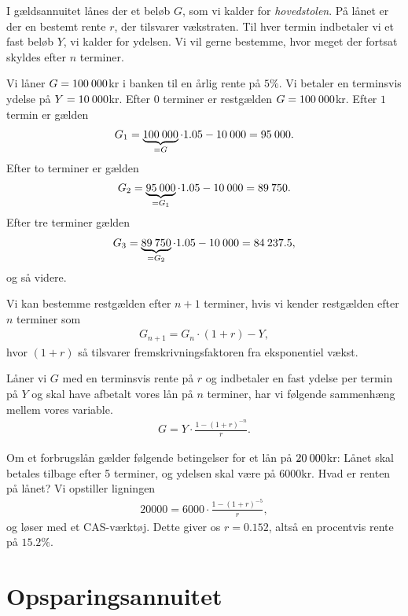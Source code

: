 \documentclass[12pt]{article}
\begin{document}
I gældsannuitet lånes der et beløb $G$, som vi kalder for \textit{hovedstolen}. På lånet er der en bestemt rente $r$, der tilsvarer vækstraten. Til hver termin indbetaler vi et fast beløb $Y$, vi kalder for ydelsen. Vi vil gerne bestemme, hvor meget der fortsat skyldes efter $n$ terminer. 
\begin{exa}
Vi låner $G=100 \hspace{0.8mm} 000$kr i banken til en årlig rente på $5\%$. Vi betaler en terminsvis ydelse på $Y=10 \hspace{0.8mm} 000$kr.
Efter $0$ terminer er restgælden $G=100 \hspace{0.8mm} 000$kr. Efter $1$ termin er gælden
\begin{align*}
G_1 = \underbrace{100 \hspace{0.8mm} 000}_{=G}\cdot 1.05 - 10 \hspace{0.8mm} 000 = 95 \hspace{0.8mm} 000.
\end{align*}   
Efter to terminer er gælden 
\begin{align*}
G_2 = \underbrace{95 \hspace{0.8mm} 000}_{=G_1}\cdot 1.05-10 \hspace{0.8mm} 000 = 89 \hspace{0.8mm} 750.
\end{align*}
Efter tre terminer gælden 
\begin{align*}
G_3 = \underbrace{89 \hspace{0.8mm} 750}_{=G_2} \cdot 1.05 - 10 \hspace{0.8mm} 000 = 84 \hspace{0.8mm} 237.5,
\end{align*}
og så videre. 
\end{exa}
Vi kan bestemme restgælden efter $n+1$ terminer, hvis vi kender restgælden efter $n$ terminer som
\begin{align*}
G_{n+1} = G_{n}\cdot (1+r) - Y, 
\end{align*}
hvor $(1+r)$ så tilsvarer fremskrivningsfaktoren fra eksponentiel vækst. 
\begin{setn}
Låner vi $G$ med en terminsvis rente på $r$ og indbetaler en fast ydelse per termin på $Y$ og skal have afbetalt vores lån på $n$ terminer, har vi følgende sammenhæng mellem vores variable.
\begin{align*}
G = Y\cdot \frac{1-(1+r)^{-n}}{r}.
\end{align*}
\end{setn}
\begin{exa}
Om et forbrugslån gælder følgende betingelser for et lån på $20 \hspace{0.8mm} 000$kr: Lånet skal betales tilbage efter 5 terminer, og ydelsen skal være på 6000kr. Hvad er renten på lånet? Vi opstiller ligningen
\begin{align*}
20000 = 6000\cdot \frac{1-(1+r)^{-5}}{r},
\end{align*}
og løser med et CAS-værktøj. Dette giver os $r = 0.152$, altså en procentvis rente på $15.2\%$.
\end{exa}

\section*{Opsparingsannuitet}
\end{document}
